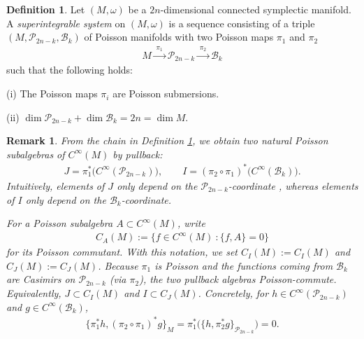 \documentclass[11pt,reqno]{amsart}
\newtheorem*{theorem A}{Main Theorem A}
\newtheorem*{theorem B}{Main Theorem B}
\newtheorem*{theorem C}{Main Theorem C}
\newtheorem*{theorem D}{Main Theorem D}
\theoremstyle{definition}
\newtheorem{definition}[theorem]{Definition}
\theoremstyle{plain}
\newtheorem{remark}[theorem]{Remark}
\theoremstyle{conclusion}
\begin{document}
\begin{definition} 
\label{def:superge} 
Let $(M,\omega)$ be a $2n$-dimensional connected symplectic manifold. A \textit{superintegrable system} on $(M,\omega)$ is a sequence consisting of a triple $(M,\mathcal{P}_{2n-k},\mathcal{B}_k)$ of Poisson manifolds with two Poisson maps $\pi_1$ and $\pi_2$ \begin{align}
M \xrightarrow{\;\pi_1\;} \mathcal{P}_{2n-k} \xrightarrow{\;\pi_2\;} \mathcal{B}_k \label{eq:sup}
\end{align} such that the following holds:

(i) The Poisson maps  $\pi_i$ are Poisson submersions. %


(ii) $\dim \mathcal{P}_{2n-k}+\dim \mathcal{B}_k = 2n = \dim M$. 
\end{definition}
 \begin{remark}
 \label{rkm:ijc}
From the chain in Definition \ref{def:superge}, we obtain two natural Poisson subalgebras of $C^\infty(M)$ by pullback: \begin{align*}
    J=\pi_1^*\bigl(C^\infty(\mathcal{P}_{2n-k})\bigr), \qquad I=(\pi_2\circ\pi_1)^*\bigl(C^\infty(\mathcal{B}_k)\bigr).
\end{align*} Intuitively, elements of $J$ only depend on the $\mathcal{P}_{2n-k}$-coordinate , whereas elements of $I$ only depend on the $\mathcal{B}_k$-coordinate.

For a Poisson subalgebra $A\subset C^\infty(M)$, write \begin{align*}
    C_A(M):=\{f\in C^\infty(M) \ :  \{f,A\}=0\}
\end{align*} for its Poisson commutant. With this notation, we set $C_I(M):=C_I(M)$ and $C_J(M):=C_J(M)$.
Because $\pi_1$ is Poisson and the functions coming from $\mathcal{B}_k$ are Casimirs on $\mathcal{P}_{2n-k}$ (via $\pi_2$), the two pullback algebras Poisson-commute. Equivalently,  $J\subset C_I(M)$  and $I\subset C_J(M)$. Concretely, for $h\in C^\infty(\mathcal{P}_{2n-k})$ and $g\in C^\infty(\mathcal{B}_k)$, \begin{align*}
   \{\pi_1^*h,(\pi_2\circ\pi_1)^*g\}_M =\pi_1^*\bigl(\{h,\pi_2^*g\}_{\mathcal{P}_{2n-k}}\bigr) = 0. 
\end{align*} 
 \end{remark}
\end{document}
